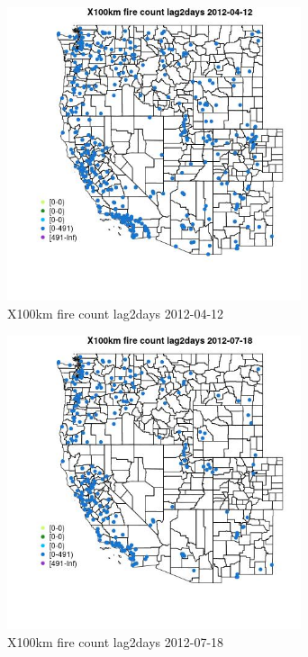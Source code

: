 \begin{figure} 
\centering  
\includegraphics[width=0.77\textwidth]{Code_Outputs/Report_ML_input_PM25_Step4_part_e_de_duplicated_aves_compiled_2019-05-14wNAs_MapObsX100km_fire_count_lag2days2012-04-12.jpg} 
\caption{\label{fig:Report_ML_input_PM25_Step4_part_e_de_duplicated_aves_compiled_2019-05-14wNAsMapObsX100km_fire_count_lag2days2012-04-12}X100km fire count lag2days 2012-04-12} 
\end{figure} 
 

\begin{figure} 
\centering  
\includegraphics[width=0.77\textwidth]{Code_Outputs/Report_ML_input_PM25_Step4_part_e_de_duplicated_aves_compiled_2019-05-14wNAs_MapObsX100km_fire_count_lag2days2012-07-18.jpg} 
\caption{\label{fig:Report_ML_input_PM25_Step4_part_e_de_duplicated_aves_compiled_2019-05-14wNAsMapObsX100km_fire_count_lag2days2012-07-18}X100km fire count lag2days 2012-07-18} 
\end{figure} 
 

